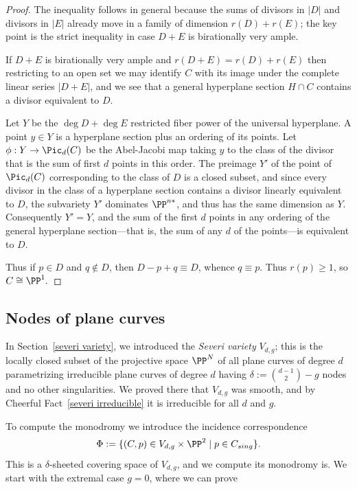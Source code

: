 \begin{proof}
 The inequality follows in general because the sums of divisors in $|D|$ and divisors in $|E|$ already move in 
 a family of dimension $r(D)+r(E)$; the key point is the strict inequality in case $D+E$ is birationally very ample.
 
If $D+E$ is birationally very ample and $r(D+E) = r(D)+r(E)$ then restricting to an open set
we may identify $C$ with its image under the complete linear series $|D+E|$, and we see that a general hyperplane section $H\cap C$ contains a divisor equivalent to $D$.

Let $Y$ be the $\deg D +\deg E$ restricted fiber power of the universal hyperplane.
A point $y\in Y$ is a hyperplane section plus an ordering of its points.  Let $\phi: Y \to \Pic_d(C)$ be the Abel-Jacobi map taking $y$
 to the class of the divisor that is the sum of first $d$ points in this order. The preimage  $Y'$ of the point of $\Pic_d(C)$ corresponding to the class of $D$ is a closed subset, and
since every divisor in the class of a hyperplane section contains a divisor
linearly equivalent to  $D$, the subvariety $Y'$ dominates $\PP^{n*}$, and thus
has the same dimension as $Y$. Consequently $Y'=Y$, and the sum of the first $d$ points
in any ordering of the general hyperplane section---that is, the sum of any $d$
of the points---is equivalent to $D$.

Thus if $p\in D$ and $q\notin D$, then $D-p+q \equiv D$, whence $q\equiv p$. Thus
$r(p)\geq 1$, so $C\cong \PP^1.$
\end{proof}

\subsection{Nodes of plane curves}\label{plane curve nodes}

In Section~\ref{severi variety}, we introduced the \emph{Severi variety} $V_{d,g}$; this is the locally closed subset of the projective space $\PP^N$ of all plane curves of degree $d$ parametrizing irreducible plane curves of degree $d$ having $\delta := \binom{d-1}{2} - g$ nodes and no other singularities. We proved there that $V_{d,g}$ was smooth, and by Cheerful Fact~\ref{severi irreducible} it is irreducible for all $d$ and $g$. 

To compute the monodromy we introduce the incidence correspondence
$$
\Phi := \{(C, p) \in V_{d,g} \times \PP^2 \mid p \in C_{sing} \}.
$$ 
This is a $\delta$-sheeted covering space of $V_{d,g}$, and we compute its monodromy is. We start with the extremal case $g = 0$, where we can prove

